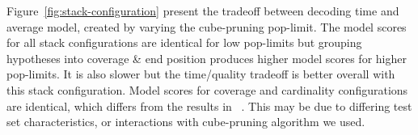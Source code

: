 \documentclass[]{article}
\begin{document}
Figure~\ref{fig:stack-configuration} present the tradeoff between decoding time and average model, created by varying the cube-pruning pop-limit. The model scores for all stack configurations are identical for low pop-limits but grouping hypotheses into coverage \& end position produces higher model scores for higher pop-limits. It is also slower but the time/quality tradeoff is better overall with this stack configuration. Model scores for coverage and cardinality configurations are identical, which differs from the results in ~\cite{ortizmartinez-garciavarea-casacuberta:2006:WMT}. This may be due to differing test set characteristics, or interactions with cube-pruning algorithm we used.
\end{document}
